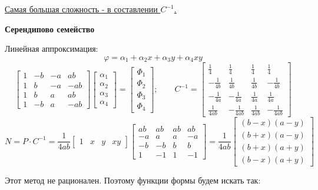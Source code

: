 \documentclass{bmstu}
\begin{document}
\begin{enumerate}
		\underline{Самая большая сложность - в составлении $C^{-1}$.}
		
		\begin{center}
			\textbf{Серендипово семейство}
		\end{center}
		
		Линейная аппроксимация: 
		\[
		\varphi = \alpha_1 +\alpha_2 x+\alpha_3 y +\alpha_4 xy
		\]
		\[
		\begin{bmatrix}
			1 & -b & -a & ab \\
			1 & b & -a &-ab \\
			1 & b & a & ab \\
			1 & -b & a & -ab
		\end{bmatrix}
		\begin{bmatrix}
			\alpha_1 \\ \alpha_2 \\ \alpha_3 \\ \alpha_4 
		\end{bmatrix} = \begin{bmatrix}
		\Phi_1 \\ \Phi_2 \\ \Phi_3 \\ \Phi_4  		
		\end{bmatrix}; \qquad C^{-1}= \begin{bmatrix}
		\frac{1}{4} & \frac{1}{4} & \frac{1}{4} & \frac{1}{4} \\
		-\frac{1}{4b} & \frac{1}{4b} & \frac{1}{4b} & -\frac{1}{4b} \\
		-\frac{1}{4a} & -\frac{1}{4a} & \frac{1}{4a} & \frac{1}{4a} \\
		\frac{1}{4ab} & -\frac{1}{4ab} & \frac{1}{4ab} & -\frac{1}{4ab} 
		\end{bmatrix}
		\]
		\[
	N = P\cdot C^{-1} = \frac{1}{4ab}\begin{bmatrix}
		1 & x & y & xy 
	\end{bmatrix} \begin{bmatrix}
	ab & ab & ab & ab \\
	-a & a & a & -a \\
	-b & -b & b & b \\
	1 & -1 & 1 & -1
	\end{bmatrix} =  \frac{1}{4ab} \begin{bmatrix}
	(b-x)(a-y) \\ (b+x)(a-y) \\ (b+x)(a+y) \\ (b-x)(a+y)
	\end{bmatrix}
		\]
		
	Этот метод не рационален. Поэтому функции формы будем искать так:
	
	\end{enumerate}
\end{document}
